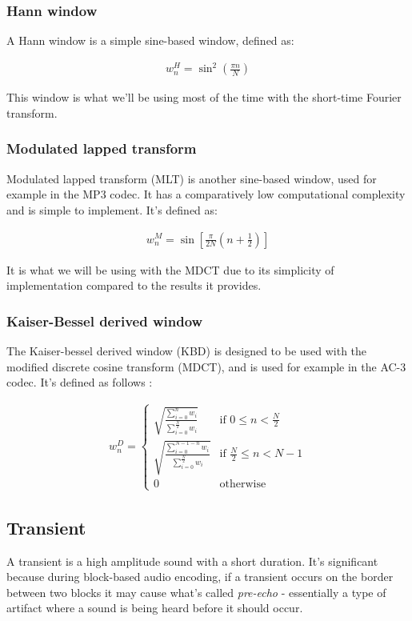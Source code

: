 \subsubsection{Hann window}
A Hann window is a simple sine-based window, defined as:

\begin{align}
w_n^H = \sin^2 \left( \frac{\pi n}{N} \right)
\end{align}

This window is what we'll be using most of the time with the short-time Fourier transform.

\subsubsection{Modulated lapped transform}
Modulated lapped transform (MLT) is another sine-based window, used for example in the MP3 codec. It has a comparatively low computational complexity and is simple to implement. \cite{malvar_1990} It's defined as:

\begin{align}
w_n^M = \sin \left[ \frac{\pi}{2N} \left( n + \frac12 \right) \right]
\end{align}

It is what we will be using with the MDCT due to its simplicity of implementation compared to the results it provides.

\subsubsection{Kaiser-Bessel derived window}
The Kaiser-bessel derived window (KBD) is designed to be used with the modified discrete cosine transform (MDCT), and is used for example in the AC-3 codec. It's defined as follows \cite{bosi_goldberg_2003}:

\begin{align}
w_n^D = \begin{cases}
\sqrt{\frac{\sum_{i=0}^{n}w_i}{\sum_{i=0}^{\frac{N}{2}}w_i}} & \text{if $0 \le n < \frac{N}{2}$} \\
\sqrt{\frac{\sum_{i=0}^{N-1-n}w_i}{\sum_{i=0}^{\frac{N}{2}}w_i}} & \text{if $\frac{N}{2} \le n < N - 1$} \\
0 & \text{otherwise}
\end{cases}
\end{align}

\subsection{Transient}
A transient is a high amplitude sound with a short duration. It's significant because during block-based audio encoding, if a transient occurs on the border between two blocks it may cause what's called \emph{pre-echo} - essentially a type of artifact where a sound is being heard before it should occur.

